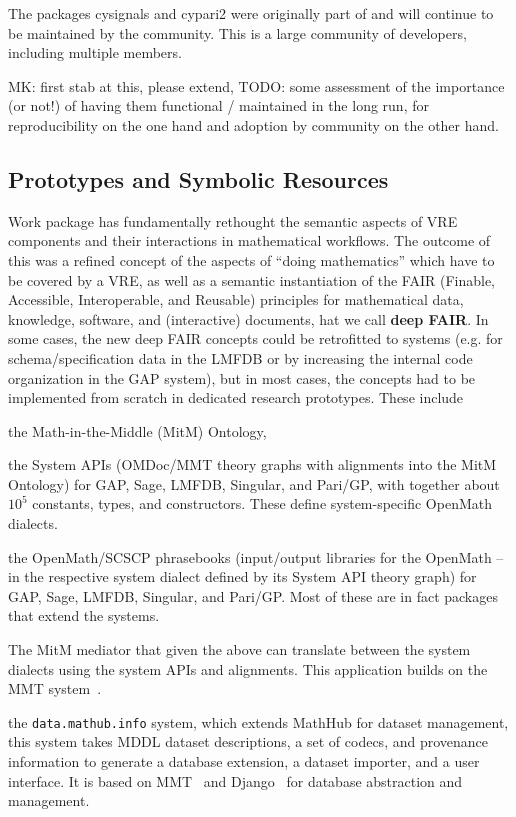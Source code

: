 \documentclass{deliverablereport}
\def\dmh{\texttt{data.mathub.info}\xspace}
\begin{document}
The packages cysignals and cypari2 were originally part of \Sage
and will continue to be maintained by the \Sage community.
This is a large community of developers, including multiple \ODK members.

\begin{newpart}{MK: first stab at this, please extend, TODO: some assessment of the importance (or not!) of having them functional / maintained in the long run, for reproducibility on the one hand and adoption by community on the other hand.}
  \subsection{Prototypes and Symbolic Resources}

Work package  has fundamentally rethought the semantic aspects of VRE components and their interactions in mathematical workflows.
The outcome of this was a refined concept of the aspects of ``doing mathematics'' which have to be covered by a VRE, as well as a semantic instantiation of the FAIR (Finable, Accessible, Interoperable, and Reusable) principles for mathematical data, knowledge, software, and (interactive) documents, hat we call \textbf{deep FAIR}. 
In some cases, the new deep FAIR concepts could be retrofitted to \pn systems (e.g. for schema/specification data in the LMFDB or by increasing the internal code organization in the GAP system), but in most cases, the concepts had to be implemented from scratch in dedicated research prototypes. These include
\begin{compactenum}
\item the Math-in-the-Middle (MitM) Ontology,
\item the System APIs (OMDoc/MMT theory graphs with alignments into the MitM Ontology) for GAP, Sage, LMFDB, Singular, and Pari/GP, with together about $10^5$ constants, types, and constructors. These define system-specific OpenMath dialects. 
\item the OpenMath/SCSCP phrasebooks (input/output libraries for the OpenMath -- in the respective system dialect defined by its System API theory graph) for GAP, Sage, LMFDB, Singular, and Pari/GP. Most of these are in fact packages that extend the systems.  
  \item The MitM mediator that  given the above can translate between the system dialects using the system APIs and alignments. This application builds on the MMT system~\cite{uniformal:on}. 
  \item the \dmh system, which extends MathHub for dataset management, this system takes MDDL dataset descriptions, a set of codecs, and provenance information to generate a database extension, a dataset importer, and a user interface.  It is based on MMT~\cite{uniformal:on} and Django~\cite{django:on} for database abstraction and management. 
  \end{compactenum}
\end{newpart}
\end{document}
